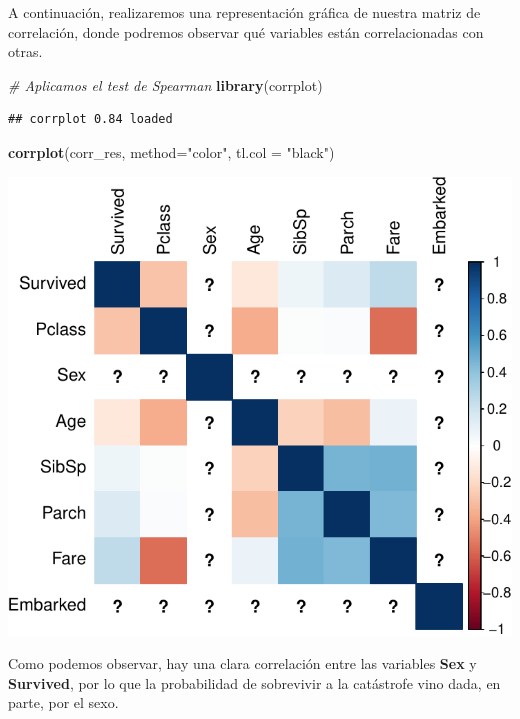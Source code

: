 \documentclass[]{article}
\newenvironment{Shaded}{\begin{snugshade}}{\end{snugshade}}
\newcommand{\CommentTok}[1]{\textcolor[rgb]{0.56,0.35,0.01}{\textit{#1}}}
\newcommand{\DataTypeTok}[1]{\textcolor[rgb]{0.13,0.29,0.53}{#1}}
\newcommand{\KeywordTok}[1]{\textcolor[rgb]{0.13,0.29,0.53}{\textbf{#1}}}
\newcommand{\NormalTok}[1]{#1}
\newcommand{\StringTok}[1]{\textcolor[rgb]{0.31,0.60,0.02}{#1}}
\begin{document}
A continuación, realizaremos una representación gráfica de nuestra
matriz de correlación, donde podremos observar qué variables están
correlacionadas con otras.

\begin{Shaded}
\begin{Highlighting}[]
\CommentTok{# Aplicamos el test de Spearman}
\KeywordTok{library}\NormalTok{(corrplot)}
\end{Highlighting}
\end{Shaded}

\begin{verbatim}
## corrplot 0.84 loaded
\end{verbatim}

\begin{Shaded}
\begin{Highlighting}[]
\KeywordTok{corrplot}\NormalTok{(corr_res, }\DataTypeTok{method=}\StringTok{"color"}\NormalTok{, }\DataTypeTok{tl.col =} \StringTok{"black"}\NormalTok{)}
\end{Highlighting}
\end{Shaded}

\includegraphics{titanic_data_analysis_PRA2_files/figure-latex/unnamed-chunk-23-1.pdf}

Como podemos observar, hay una clara correlación entre las variables
\textbf{Sex} y \textbf{Survived}, por lo que la probabilidad de
sobrevivir a la catástrofe vino dada, en parte, por el sexo.
\end{document}
